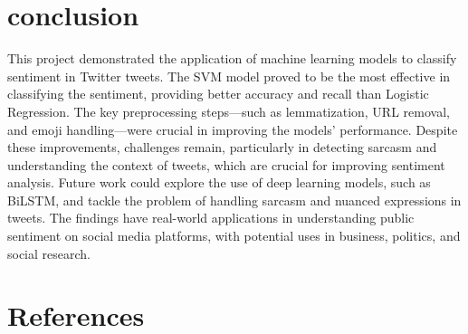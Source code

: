 \documentclass[conference]{IEEEtran}
\begin{document}
\section{conclusion}
This project demonstrated the application of machine learning models to classify sentiment in Twitter tweets. The SVM model proved to be the 
most effective in classifying the sentiment, providing better accuracy and recall than Logistic Regression. The key preprocessing steps—such as 
lemmatization, URL removal, and emoji handling—were crucial in improving the models' performance. Despite these improvements, challenges remain, 
particularly in detecting sarcasm and understanding the context of tweets, which are crucial for improving sentiment analysis. Future work could 
explore the use of deep learning models, such as BiLSTM, and tackle the problem of handling sarcasm and nuanced expressions in tweets. The findings
 have real-world applications in understanding public sentiment on social media platforms, with potential uses in business, politics, and social 
 research.
\section*{References}


\begin{thebibliography}{00}
\bibitem
\end{thebibliography}
\vspace{12pt}
\end{document}
